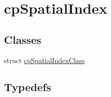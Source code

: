 \hypertarget{group__cpSpatialIndex}{}\section{cp\+Spatial\+Index}
\label{group__cpSpatialIndex}
\subsection*{Classes}
\begin{DoxyCompactItemize}
\item 
struct \hyperlink{structcpSpatialIndexClass}{cp\+Spatial\+Index\+Class}
\end{DoxyCompactItemize}
\subsection*{Typedefs}
